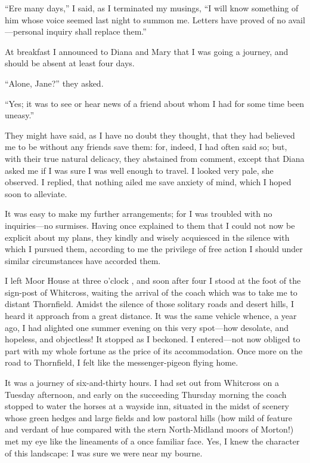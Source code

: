 \enquote{Ere many days,} I said, as I terminated my musings, \enquote{I
will know something of him whose voice seemed last night to summon me. 
Letters have proved of no avail---personal inquiry shall replace them.}

At breakfast I announced to Diana and Mary that I was going a journey,
and should be absent at least four days.

\enquote{Alone, Jane?} they asked.

\enquote{Yes; it was to see or hear news of a friend about whom I had
for some time been uneasy.}

They might have said, as I have no doubt they thought, that they had
believed me to be without any friends save them: for, indeed, I had
often said so; but, with their true natural delicacy, they abstained
from comment, except that Diana asked me if I was sure I was well enough
to travel. I looked very pale, she observed. I replied, that nothing
ailed me save anxiety of mind, which I hoped soon to alleviate.

It was easy to make my further arrangements; for I was troubled with no
inquiries---no surmises. Having once explained to them that I could not
now be explicit about my plans, they kindly and wisely acquiesced in the
silence with which I pursued them, according to me the privilege of free
action I should under similar circumstances have accorded them.

I left Moor House at three o'clock \PM, and soon after four I stood at
the foot of the sign-post of Whitcross, waiting the arrival of the coach
which was to take me to distant Thornfield. Amidst the silence of those
solitary roads and desert hills, I heard it approach from a great
distance. It was the same vehicle whence, a year ago, I had alighted
one summer evening on this very spot---how desolate, and hopeless, and
objectless! It stopped as I beckoned. I entered---not now obliged to
part with my whole fortune as the price of its accommodation. Once more
on the road to Thornfield, I felt like the messenger-pigeon flying home.

It was a journey of six-and-thirty hours. I had set out from Whitcross
on a Tuesday afternoon, and early on the succeeding Thursday morning the
coach stopped to water the horses at a wayside inn, situated in the
midst of scenery whose green hedges and large fields and low pastoral
hills (how mild of feature and verdant of hue compared with the stern
North-Midland moors of Morton!) met my eye like the lineaments of a once
familiar face. Yes, I knew the character of this landscape: I was sure
we were near my bourne.

